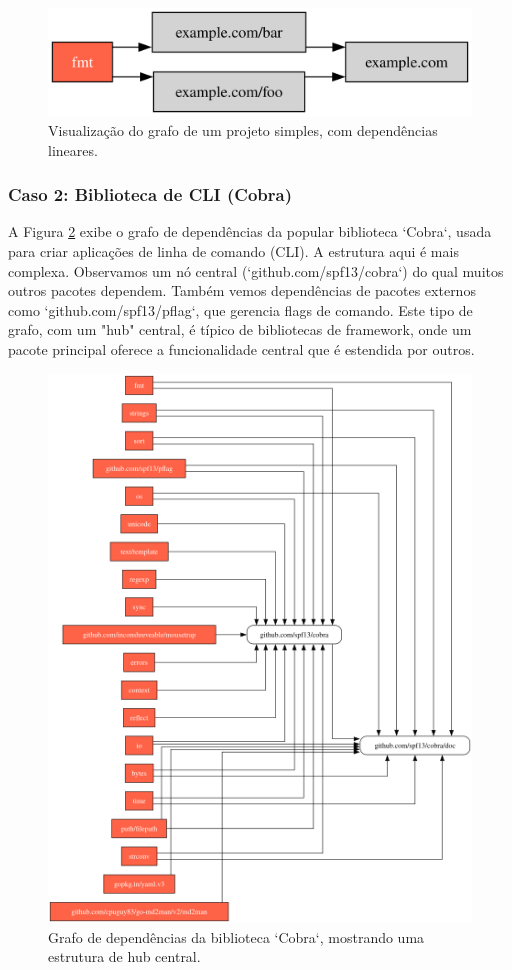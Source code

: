 \documentclass[12pt]{article}
\begin{document}
\begin{figure}[htbp]
\centering
\includegraphics[width=.75\textwidth]{examples/example.com.png}
\caption{Visualização do grafo de um projeto simples, com dependências lineares.}
\label{fig:grafoExemplo}
\end{figure}

\FloatBarrier

\subsubsection{Caso 2: Biblioteca de CLI (Cobra)}
A Figura \ref{fig:exemplo-2} exibe o grafo de dependências da popular biblioteca `Cobra`, usada para criar aplicações de linha de comando (CLI). A estrutura aqui é mais complexa. Observamos um nó central (`github.com/spf13/cobra`) do qual muitos outros pacotes dependem. Também vemos dependências de pacotes externos como `github.com/spf13/pflag`, que gerencia flags de comando. Este tipo de grafo, com um "hub" central, é típico de bibliotecas de framework, onde um pacote principal oferece a funcionalidade central que é estendida por outros.

\begin{figure}[htbp]
\centering
\includegraphics[width=.6\textwidth]{examples/github.com_spf13_cobra.png}
\caption{Grafo de dependências da biblioteca `Cobra`, mostrando uma estrutura de hub central.}
\label{fig:exemplo-2}
\end{figure}
\end{document}
